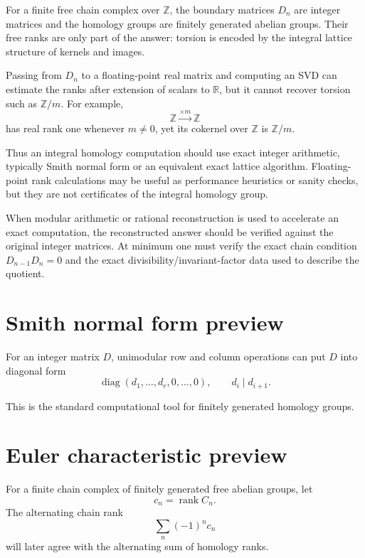 \begin{remark}
For a finite free chain complex over \(\mathbb Z\), the boundary matrices
\(D_n\) are integer matrices and the homology groups are finitely generated
abelian groups.  Their free ranks are only part of the answer: torsion is
encoded by the integral lattice structure of kernels and images.

Passing from \(D_n\) to a floating-point real matrix and computing an SVD can
estimate the ranks after extension of scalars to \(\mathbb R\), but it cannot
recover torsion such as \(\mathbb Z/m\).  For example,
\[
\mathbb Z\xrightarrow{\times m}\mathbb Z
\]
has real rank one whenever \(m\neq0\), yet its cokernel over \(\mathbb Z\) is
\(\mathbb Z/m\).

Thus an integral homology computation should use exact integer arithmetic,
typically Smith normal form or an equivalent exact lattice algorithm.
Floating-point rank calculations may be useful as performance heuristics or
sanity checks, but they are not certificates of the integral homology group.

When modular arithmetic or rational reconstruction is used to accelerate an
exact computation, the reconstructed answer should be verified against the
original integer matrices.  At minimum one must verify the exact chain
condition \(D_{n-1}D_n=0\) and the exact divisibility/invariant-factor data used
to describe the quotient.
\end{remark}

\section{Smith normal form preview}

For an integer matrix \(D\), unimodular row and column operations can put \(D\)
into diagonal form
\[
\operatorname{diag}(d_1,\dots,d_r,0,\dots,0),
\qquad
d_i\mid d_{i+1}.
\]

This is the standard computational tool for finitely generated homology groups.

\section{Euler characteristic preview}

For a finite chain complex of finitely generated free abelian groups, let
\[
c_n=\operatorname{rank}C_n.
\]
The alternating chain rank
\[
\sum_n(-1)^n c_n
\]
will later agree with the alternating sum of homology ranks.

